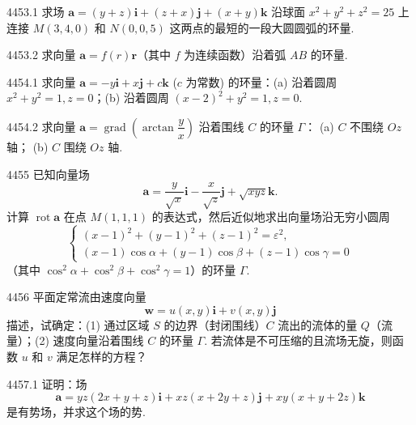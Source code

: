 \begin{prob}[M]{4453.1}
求场 $\boldsymbol{a} = (y + z)\boldsymbol{i} + (z + x)\boldsymbol{j} + (x + y)\boldsymbol{k}$ 沿球面 $x^2 + y^2 + z^2 = 25$ 上连接 $M(3, 4, 0)$ 和 $N(0, 0, 5)$ 这两点的最短的一段大圆圆弧的环量.
\end{prob}

\begin{prob}[S]{4453.2}
求向量 $\boldsymbol{a} = f(r)\boldsymbol{r}$（其中 $f$ 为连续函数）沿着弧 $AB$ 的环量.
\end{prob}

\begin{prob}[M]{4454.1}
求向量 $\boldsymbol{a} = -y\boldsymbol{i} + x\boldsymbol{j} + c\boldsymbol{k}$ ($c$ 为常数) 的环量：(a) 沿着圆周 $x^2 + y^2 = 1, z = 0$；(b) 沿着圆周 $(x - 2)^2 + y^2 = 1, z = 0$.
\end{prob}

\begin{prob}[M]{4454.2}
求向量 $\boldsymbol{a} = \operatorname{grad}\left(\arctan\dfrac{y}{x}\right)$ 沿着围线 $C$ 的环量 $\Gamma$：
(a) $C$ 不围绕 $Oz$ 轴； \qquad (b) $C$ 围绕 $Oz$ 轴.
\end{prob}

\begin{prob}[M]{4455}
已知向量场
\[
\boldsymbol{a} = \frac{y}{\sqrt{x}}\boldsymbol{i} - \frac{x}{\sqrt{z}}\boldsymbol{j} + \sqrt{xyz}\boldsymbol{k}.
\]
计算 $\operatorname{rot} \boldsymbol{a}$ 在点 $M(1, 1, 1)$ 的表达式，然后近似地求出向量场沿无穷小圆周
\[
\begin{cases}
(x - 1)^2 + (y - 1)^2 + (z - 1)^2 = \varepsilon^2, \\
(x - 1)\cos\alpha + (y - 1)\cos\beta + (z - 1)\cos\gamma = 0
\end{cases}
\]
（其中 $\cos^2\alpha + \cos^2\beta + \cos^2\gamma = 1$）的环量 $\Gamma$.
\end{prob}

\begin{prob}[L]{4456}
平面定常流由速度向量
\[
\boldsymbol{w} = u(x, y)\boldsymbol{i} + v(x, y)\boldsymbol{j}
\]
描述，试确定：(1) 通过区域 $S$ 的边界（封闭围线）$C$ 流出的流体的量 $Q$（流量）；(2) 速度向量沿着围线 $C$ 的环量 $\Gamma$. 若流体是不可压缩的且流场无旋，则函数 $u$ 和 $v$ 满足怎样的方程？
\end{prob}

\begin{prob}[M]{4457.1}
证明：场
\[
\boldsymbol{a} = yz(2x+y+z)\boldsymbol{i} + xz(x+2y+z)\boldsymbol{j} + xy(x+y+2z)\boldsymbol{k}
\]
是有势场，并求这个场的势.
\end{prob}

